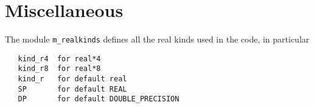 %  
%  
%  
\section{Miscellaneous}
%
The module {\tt m\_realkinds} defines all the real kinds used in the code, 
in particular
%
\begin{verbatim}
   kind_r4  for real*4
   kind_r8  for real*8
   kind_r   for default real
   SP       for default REAL
   DP       for default DOUBLE_PRECISION
\end{verbatim}
% 
